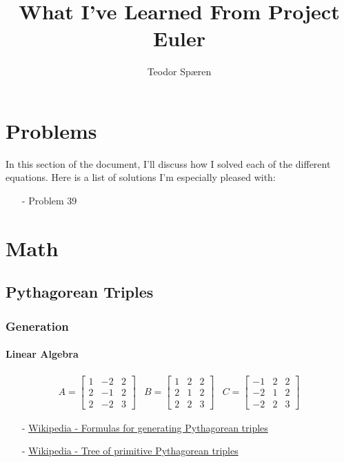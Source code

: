 \documentclass[a4paper]{article}
\begin{document}
\title{What I've Learned From Project Euler}
\author{Teodor Spæren}

\maketitle

\tableofcontents

\section{Problems}
In this section of the document, I'll discuss how I solved each of the different equations. Here is a list of solutions
I'm especially pleased with:

\begin{itemize}
    \item[-] Problem 39
\end{itemize}

\section{Math}
\subsection{Pythagorean Triples}

\subsubsection{Generation}

\paragraph{Linear Algebra}

\begin{equation}
    \begin{array}{lcr}
    A = \begin{bmatrix} 1 & -2 & 2 \\ 2 & -1 & 2 \\ 2 & -2 & 3 \end{bmatrix} &
    B = \begin{bmatrix} 1 & 2 & 2 \\ 2 & 1 & 2 \\ 2 & 2 & 3 \end{bmatrix} &
    C = \begin{bmatrix} -1 & 2 & 2 \\ -2 & 1 & 2 \\ -2 & 2 & 3 \end{bmatrix}
    \end{array}
\end{equation}

\begin{itemize}
    \item[-]\href{http://en.wikipedia.org/wiki/Formulas_for_generating_Pythagorean_triples}{Wikipedia - Formulas for generating Pythagorean triples}
    \item[-]\href{http://en.wikipedia.org/wiki/Tree_of_primitive_Pythagorean_triples}{Wikipedia - Tree of primitive Pythagorean triples}
\end{itemize}
\end{document}
